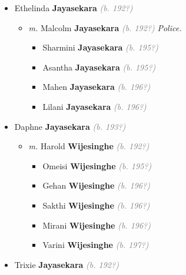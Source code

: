 \documentclass[10pt, openany]{book}
\begin{document}
\begin{itemize}
{\begin{itemize}
{\begin{itemize}
{\begin{itemize}
{\begin{itemize}
\end{itemize}
   }
\item{Ethelinda \textbf{Jayasekara} \textcolor{gray}{\textit{(b. 192?)}}
\begin{itemize}
\item{\textit{m.} Malcolm \textbf{Jayasekara} \textcolor{gray}{\textit{(b. 192?)}} \textcolor{slmaroon}{\textit{Police.}}   \label{couple:00000291:00000304} \begin{itemize}
\item{Sharmini \textbf{Jayasekara} \textcolor{gray}{\textit{(b. 195?)}}
 }
\item{Asantha \textbf{Jayasekara} \textcolor{gray}{\textit{(b. 195?)}}
 }
\item{Mahen \textbf{Jayasekara} \textcolor{gray}{\textit{(b. 196?)}}
 }
\item{Lilani \textbf{Jayasekara} \textcolor{gray}{\textit{(b. 196?)}}
 }
\end{itemize}}
\end{itemize}
 }
\item{Daphne \textbf{Jayasekara} \textcolor{gray}{\textit{(b. 193?)}}
\begin{itemize}
\item{\textit{m.} Harold \textbf{Wijesinghe} \textcolor{gray}{\textit{(b. 192?)}}   \label{couple:00000288:00001000} \begin{itemize}
\item{Omeisi \textbf{Wijesinghe} \textcolor{gray}{\textit{(b. 195?)}}
 }
\item{Gehan \textbf{Wijesinghe} \textcolor{gray}{\textit{(b. 196?)}}
 }
\item{Sakthi \textbf{Wijesinghe} \textcolor{gray}{\textit{(b. 196?)}}
 }
\item{Mirani \textbf{Wijesinghe} \textcolor{gray}{\textit{(b. 196?)}}
 }
\item{Varini \textbf{Wijesinghe} \textcolor{gray}{\textit{(b. 197?)}}
 }
\end{itemize}}
\end{itemize}
 }
\item{Trixie \textbf{Jayasekara} \textcolor{gray}{\textit{(b. 192?)}}
}
\end{itemize}}
\end{itemize}}
\end{itemize}}
\end{itemize}
\end{document}
